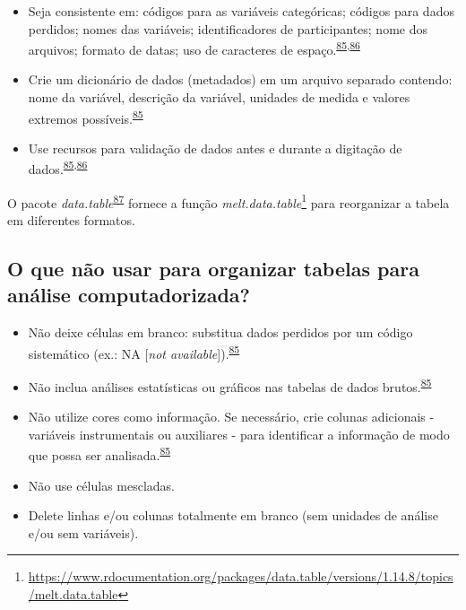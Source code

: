 \documentclass[
  a4paper,
]{book}
\renewcommand{\href}[2]{#2\footnote{\url{#1}}}
\newenvironment{infobox}[1]
  {
  \begin{itemize}
  \renewcommand{\labelitemi}{
    \raisebox{-.7\height}[0pt][0pt]{
      {\setkeys{Gin}{width=3em,keepaspectratio}
        \texttt{[image: \#1]}}
    }
  }
  \setlength{\fboxsep}{1em}
  \begin{blackbox}
  \item
  }
  {
  \end{blackbox}
  \end{itemize}
  }
\begin{document}
\begin{itemize}
\item
  Seja consistente em: códigos para as variáveis categóricas; códigos para dados perdidos; nomes das variáveis; identificadores de participantes; nome dos arquivos; formato de datas; uso de caracteres de espaço.\textsuperscript{\protect\hyperlink{ref-broman2018}{85},\protect\hyperlink{ref-Juluru2015}{86}}
\item
  Crie um dicionário de dados (metadados) em um arquivo separado contendo: nome da variável, descrição da variável, unidades de medida e valores extremos possíveis.\textsuperscript{\protect\hyperlink{ref-broman2018}{85}}
\item
  Use recursos para validação de dados antes e durante a digitação de dados.\textsuperscript{\protect\hyperlink{ref-broman2018}{85},\protect\hyperlink{ref-Juluru2015}{86}}
\end{itemize}

\begin{infobox}{images/Rlogo}
O pacote \emph{data.table}\textsuperscript{\protect\hyperlink{ref-data.table}{87}} fornece a função \href{https://www.rdocumentation.org/packages/data.table/versions/1.14.8/topics/melt.data.table}{\emph{melt.data.table}} para reorganizar a tabela em diferentes formatos.

\end{infobox}

\hypertarget{o-que-nuxe3o-usar-para-organizar-tabelas-para-anuxe1lise-computadorizada}{%
\subsection{O que não usar para organizar tabelas para análise computadorizada?}\label{o-que-nuxe3o-usar-para-organizar-tabelas-para-anuxe1lise-computadorizada}}

\begin{itemize}
\item
  Não deixe células em branco: substitua dados perdidos por um código sistemático (ex.: NA {[}\emph{not available}{]}).\textsuperscript{\protect\hyperlink{ref-broman2018}{85}}
\item
  Não inclua análises estatísticas ou gráficos nas tabelas de dados brutos.\textsuperscript{\protect\hyperlink{ref-broman2018}{85}}
\item
  Não utilize cores como informação. Se necessário, crie colunas adicionais - variáveis instrumentais ou auxiliares - para identificar a informação de modo que possa ser analisada.\textsuperscript{\protect\hyperlink{ref-broman2018}{85}}
\item
  Não use células mescladas.
\item
  Delete linhas e/ou colunas totalmente em branco (sem unidades de análise e/ou sem variáveis).
\end{itemize}
\end{document}
